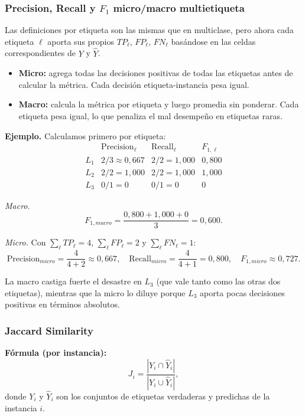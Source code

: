 \documentclass[12pt,oneside]{report}
\begin{document}
\subsubsection{Precision, Recall y $F_1$ micro/macro multietiqueta}

Las definiciones por etiqueta son las mismas que en multiclase, pero
ahora cada etiqueta $\ell$ aporta sus propios $TP_\ell$, $FP_\ell$,
$FN_\ell$ basándose en las celdas correspondientes de $Y$ y $\hat Y$.
\begin{itemize}[leftmargin=*]
  \item \textbf{Micro:} agrega todas las decisiones positivas de todas
  las etiquetas antes de calcular la métrica. Cada decisión
  etiqueta-instancia pesa igual.
  \item \textbf{Macro:} calcula la métrica por etiqueta y luego promedia
  sin ponderar. Cada etiqueta pesa igual, lo que penaliza el mal
  desempeño en etiquetas raras.
\end{itemize}

\textbf{Ejemplo.} Calculamos primero por etiqueta:
\[
\begin{array}{l|ccc}
 & \mathrm{Precision}_\ell & \mathrm{Recall}_\ell & F_{1,\ell} \\
\hline
L_1 & 2/3\approx 0{,}667 & 2/2 = 1{,}000 & 0{,}800 \\
L_2 & 2/2 = 1{,}000      & 2/2 = 1{,}000 & 1{,}000 \\
L_3 & 0/1 = 0            & 0/1 = 0       & 0
\end{array}
\]

\emph{Macro.}
\[
F_{1,macro}=\frac{0{,}800+1{,}000+0}{3}=0{,}600.
\]

\emph{Micro.} Con $\sum_\ell TP_\ell=4$, $\sum_\ell FP_\ell=2$ y
$\sum_\ell FN_\ell=1$:
\[
\mathrm{Precision}_{micro}=\frac{4}{4+2}\approx 0{,}667,\quad
\mathrm{Recall}_{micro}=\frac{4}{4+1}=0{,}800,\quad
F_{1,micro}\approx 0{,}727.
\]

La macro castiga fuerte el desastre en $L_3$ (que vale tanto como las
otras dos etiquetas), mientras que la micro lo diluye porque $L_3$
aporta pocas decisiones positivas en términos absolutos.

\subsubsection{Jaccard Similarity}

\textbf{Fórmula (por instancia):}
\[
J_i = \frac{|Y_i \cap \hat{Y}_i|}{|Y_i \cup \hat{Y}_i|},
\]
donde $Y_i$ y $\hat{Y}_i$ son los conjuntos de etiquetas verdaderas y
predichas de la instancia $i$.
\end{document}
